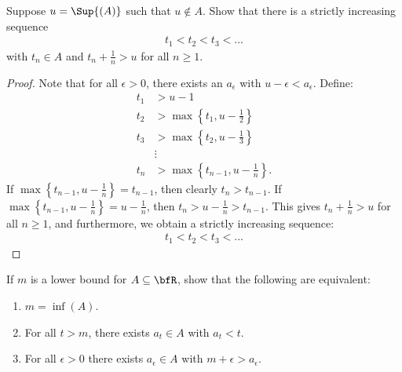 \documentclass[10pt,twoside,openany]{memoir}
\begin{document}
    \begin{exercise}
        Suppose $u = \Sup{(A)}$ such that $u \not\in A$. Show that there is a strictly increasing sequence
            \begin{equation*}
            \begin{split}
                t_1 < t_2 < t_3 < ...
            \end{split}
            \end{equation*}
        with $t_n \in A$ and $t_n + \frac{1}{n} > u$ for all $n \geq 1$.
    \end{exercise}  
        {\color{red} \begin{proof}
            Note that for all $\epsilon > 0$, there exists an $a_\epsilon$ with $u - \epsilon < a_\epsilon$. Define:
                \begin{equation*}
                \begin{split}
                    t_1 &> u - 1 \\
                    t_2 &> \max \left\{t_1, u - \frac{1}{2}\right\} \\
                    t_3 &> \max \left\{t_2, u - \frac{1}{3}\right\} \\
                    &\vdots \\
                    t_n &> \max \left\{t_{n-1}, u - \frac{1}{n} \right\}.
                \end{split}
                \end{equation*}
            If $\max \left\{t_{n-1}, u - \frac{1}{n} \right\} = t_{n-1}$, then clearly $t_n > t_{n-1}$. If $\max \left\{t_{n-1}, u - \frac{1}{n} \right\} = u - \frac{1}{n}$, then $t_n > u - \frac{1}{n} > t_{n-1}$. This gives $t_n + \frac{1}{n} > u$ for all $n \geq 1$, and furthermore, we obtain a strictly increasing sequence:
                \begin{equation*}
                \begin{split}
                    t_1 < t_2 < t_3 < ... 
                \end{split}
                \end{equation*}
                \qedhere
        \end{proof}}
    \begin{exercise}
        If $m$ is a lower bound for $A \subseteq \bfR$, show that the following are equivalent:
            \begin{enumerate}[label = (\arabic*)]
                \item $m = \inf{(A)}$.
                \item For all $t>m$, there exists $a_t \in A$ with $a_t <  t$.
                \item For all $\epsilon > 0$ there exists $a_\epsilon \in A$ with $m+\epsilon > a_\epsilon$.
            \end{enumerate}
    \end{exercise}
\end{document}
